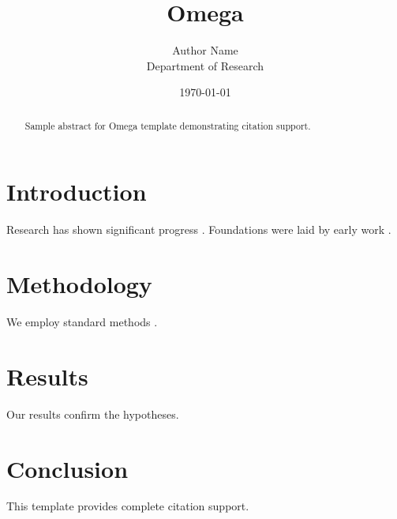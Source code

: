 ﻿\documentclass{elsarticle}
\title{Omega}
\author{Author Name \\ \small Department of Research}
\date{\today}
\begin{document}
\maketitle

\begin{abstract}
Sample abstract for Omega template demonstrating citation support.
\end{abstract}

\section{Introduction}
Research has shown significant progress \citep{einstein1905}. Foundations were laid by early work \citep{turing1950}.

\section{Methodology}
We employ standard methods \citep{knuth1984}.

\section{Results}
Our results confirm the hypotheses.

\section{Conclusion}
This template provides complete citation support.



\end{document}
